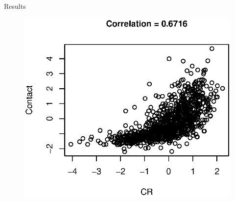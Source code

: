 \documentclass{beamer}
\theoremstyle{definition}
\begin{document}
\begin{frame}{Results}
\begin{figure}
\centering
{}
    \includegraphics[width=.75\textwidth]{img/fsdm_results/contact_corr.eps}
\endminipage
\hfill
{}


\end{figure}
\end{frame}
\end{document}
